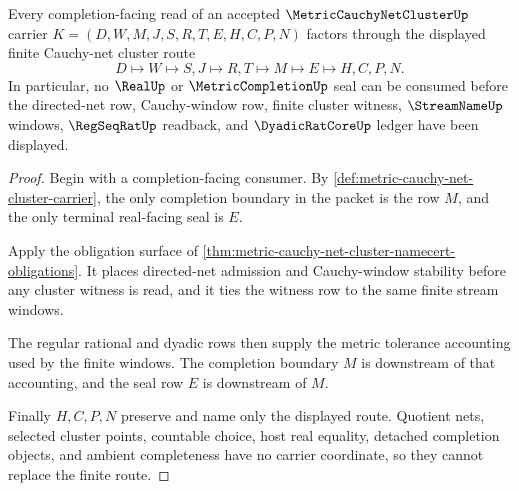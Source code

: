 \begin{theorem}
\label{thm:metric-cauchy-net-cluster-completion-handoff}
Every completion-facing read of an accepted $\MetricCauchyNetClusterUp$ carrier $K=(D,W,M,J,S,R,T,E,H,C,P,N)$ factors through the displayed finite Cauchy-net cluster route
$$
D \longmapsto W \longmapsto S,J \longmapsto R,T \longmapsto M \longmapsto E \longmapsto H,C,P,N .
$$
In particular, no $\RealUp$ or $\MetricCompletionUp$ seal can be consumed before the directed-net row, Cauchy-window row, finite cluster witness, $\StreamNameUp$ windows, $\RegSeqRatUp$ readback, and $\DyadicRatCoreUp$ ledger have been displayed.
\end{theorem}
\begin{proof}
Begin with a completion-facing consumer. By \autoref{def:metric-cauchy-net-cluster-carrier}, the only completion boundary in the packet is the row $M$, and the only terminal real-facing seal is $E$.

Apply the obligation surface of \autoref{thm:metric-cauchy-net-cluster-namecert-obligations}. It places directed-net admission and Cauchy-window stability before any cluster witness is read, and it ties the witness row to the same finite stream windows.

The regular rational and dyadic rows then supply the metric tolerance accounting used by the finite windows. The completion boundary $M$ is downstream of that accounting, and the seal row $E$ is downstream of $M$.

Finally $H,C,P,N$ preserve and name only the displayed route. Quotient nets, selected cluster points, countable choice, host real equality, detached completion objects, and ambient completeness have no carrier coordinate, so they cannot replace the finite route.
\end{proof}



